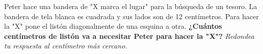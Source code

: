 \question[15]  Peter hace una bandera de "X marca el lugar" para la búsqueda de un tesoro.
La bandera de tela blanca es cuadrada y sus lados son de 12 centímetros.
Para hacer la "X" pone el listón diagonalmente de una esquina a otra.
\textbf{¿Cuántos centímetros de listón va a necesitar Peter para hacer la "X"?}
\textit{Redondea tu respuesta al centímetro más cercano.}